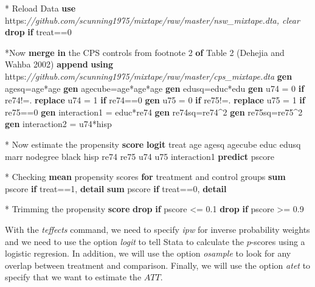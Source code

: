 \documentclass[
]{book}
\newenvironment{Shaded}{\begin{snugshade}}{\end{snugshade}}
\newcommand{\BaseNTok}[1]{\textcolor[rgb]{0.00,0.00,0.81}{#1}}
\newcommand{\CommentTok}[1]{\textcolor[rgb]{0.56,0.35,0.01}{\textit{#1}}}
\newcommand{\KeywordTok}[1]{\textcolor[rgb]{0.13,0.29,0.53}{\textbf{#1}}}
\newcommand{\NormalTok}[1]{#1}
\begin{document}
\begin{Shaded}
\begin{Highlighting}[]
\NormalTok{* Reload Data}
\KeywordTok{use}\NormalTok{ https:}\CommentTok{//github.com/scunning1975/mixtape/raw/master/nsw\_mixtape.dta, clear}
\KeywordTok{drop} \KeywordTok{if}\NormalTok{ treat==0}

\NormalTok{*Now }\KeywordTok{merge} \KeywordTok{in}\NormalTok{ the CPS controls from footnote 2 }\KeywordTok{of}\NormalTok{ Table 2 (Dehejia and Wahba 2002)}
\KeywordTok{append} \KeywordTok{using}\NormalTok{ https:}\CommentTok{//github.com/scunning1975/mixtape/raw/master/cps\_mixtape.dta}
\KeywordTok{gen}\NormalTok{ agesq=age*age}
\KeywordTok{gen}\NormalTok{ agecube=age*age*age}
\KeywordTok{gen}\NormalTok{ edusq=educ*edu}
\KeywordTok{gen}\NormalTok{ u74 = 0 }\KeywordTok{if}\NormalTok{ re74!=.}
\KeywordTok{replace}\NormalTok{ u74 = 1 }\KeywordTok{if}\NormalTok{ re74==0}
\KeywordTok{gen}\NormalTok{ u75 = 0 }\KeywordTok{if}\NormalTok{ re75!=.}
\KeywordTok{replace}\NormalTok{ u75 = 1 }\KeywordTok{if}\NormalTok{ re75==0}
\KeywordTok{gen}\NormalTok{ interaction1 = educ*re74}
\KeywordTok{gen}\NormalTok{ re74sq=re74\^{}2}
\KeywordTok{gen}\NormalTok{ re75sq=re75\^{}2}
\KeywordTok{gen}\NormalTok{ interaction2 = u74*hisp}

\NormalTok{* Now estimate the propensity }\KeywordTok{score}
\KeywordTok{logit}\NormalTok{ treat age agesq agecube educ edusq marr nodegree }\BaseNTok{black}\NormalTok{ hisp re74 re75 u74 u75 interaction1 }
\KeywordTok{predict}\NormalTok{ pscore}

\NormalTok{* Checking }\KeywordTok{mean}\NormalTok{ propensity scores }\KeywordTok{for}\NormalTok{ treatment and control groups}
\KeywordTok{sum}\NormalTok{ pscore }\KeywordTok{if}\NormalTok{ treat==1, }\KeywordTok{detail}
\KeywordTok{sum}\NormalTok{ pscore }\KeywordTok{if}\NormalTok{ treat==0, }\KeywordTok{detail}

\NormalTok{* Trimming the propensity }\KeywordTok{score}
\KeywordTok{drop} \KeywordTok{if}\NormalTok{ pscore \textless{}= 0.1 }
\KeywordTok{drop} \KeywordTok{if}\NormalTok{ pscore \textgreater{}= 0.9}
\end{Highlighting}
\end{Shaded}

With the \emph{teffects} command, we need to specify \emph{ipw} for inverse probability weights and we need to use the option \emph{logit} to tell Stata to calculate the \(p\)-scores using a logistic regresion. In addition, we will use the option \emph{osample} to look for any overlap between treatment and comparison. Finally, we will use the option \emph{atet} to specify that we want to estimate the \(ATT\).
\end{document}
